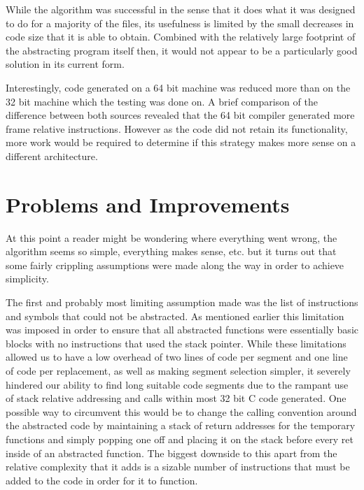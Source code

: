 \documentclass[9pt,nocopyrightspace]{sigplanconf}
\begin{document}
While the algorithm was successful in the sense that it does what it was designed to do for a majority of the files, its usefulness is limited by the small decreases in code size that it is able to obtain.
Combined with the relatively large footprint of the abstracting program itself then, it would not appear to be a particularly good solution in its current form.

Interestingly, code generated on a 64 bit machine was reduced more than on the 32 bit machine which the testing was done on.
A brief comparison of the difference between both sources revealed that the 64 bit compiler generated more frame relative instructions.
However as the code did not retain its functionality, more work would be required to determine if this strategy makes more sense on a different architecture.

\section{Problems and Improvements}

At this point a reader might be wondering where everything went wrong, the algorithm seems so simple, everything makes sense, etc. but it turns out that some fairly crippling assumptions were made along the way in order to achieve simplicity.

The first and probably most limiting assumption made was the list of instructions and symbols that could not be abstracted.
As mentioned earlier this limitation was imposed in order to ensure that all abstracted functions were essentially basic blocks with no instructions that used the stack pointer.
While these limitations allowed us to have a low overhead of two lines of code per segment and one line of code per replacement, as well as making segment selection simpler, it severely hindered our ability to find long suitable code segments due to the rampant use of stack relative addressing and calls within most 32 bit C code generated.
One possible way to circumvent this would be to change the calling convention around the abstracted code by maintaining a stack of return addresses for the temporary functions and simply popping one off and placing it on the stack before every ret inside of an abstracted function.
The biggest downside to this apart from the relative complexity that it adds is a sizable number of instructions that must be added to the code in order for it to function.
\end{document}
